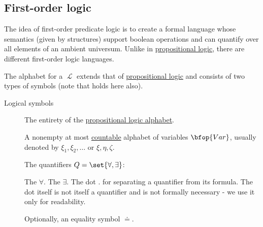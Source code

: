 \subsection{First-order logic}\label{subsec:first_order_logic}

\begin{definition}\label{def:first_order_language}\mcite\cite[187]{OpenLogic20201202}
  The idea of first-order predicate logic is to create a formal language whose semantics (given by structures) support boolean operations and can quantify over all elements of an ambient universum. Unlike in \hyperref[subsec:language_of_propositional_logic]{propositional logic}, there are different first-order logic languages.

  The alphabet for a  \( \mscrL \) extends that of \hyperref[subsec:language_of_propositional_logic]{propositional logic} and consists of two types of symbols (note that  holds here also).

  \begin{description}
    \item[Logical symbols]
    \hfill
    \begin{defenum}[series=def:first_order_language]
       The entirety of the \hyperref[subsec:language_of_propositional_logic]{propositional logic alphabet}.

       A nonempty at most \hyperref[rem:cardinals/countable]{countable} alphabet of variables \( \bfop{Var} \), usually denoted by \( \xi_1, \xi_2, \ldots \) or \( \xi, \eta, \zeta \).

       The quantifiers \( Q = \set{ \forall, \exists } \):
      \begin{defenum}
         The  \( \forall \).
         The  \( \exists \).
         The dot \( . \) for separating a quantifier from its formula. The dot itself is not itself a quantifier and is not formally necessary - we use it only for readability.
      \end{defenum}

       Optionally, an equality symbol \( \doteq \).
    \end{defenum}


\end{description}
\end{definition}
